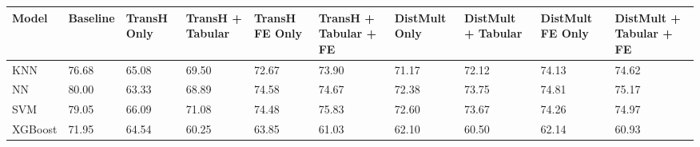\begin{tabular}{llllllllll}
\toprule
Model & Baseline & TransH Only & TransH + Tabular & TransH FE Only & TransH + Tabular + FE & DistMult Only & DistMult + Tabular & DistMult FE Only & DistMult + Tabular + FE \\
\midrule
KNN & 76.68 & 65.08 & 69.50 & 72.67 & 73.90 & 71.17 & 72.12 & 74.13 & 74.62 \\
NN & 80.00 & 63.33 & 68.89 & 74.58 & 74.67 & 72.38 & 73.75 & 74.81 & 75.17 \\
SVM & 79.05 & 66.09 & 71.08 & 74.48 & 75.83 & 72.60 & 73.67 & 74.26 & 74.97 \\
XGBoost & 71.95 & 64.54 & 60.25 & 63.85 & 61.03 & 62.10 & 60.50 & 62.14 & 60.93 \\
\bottomrule
\end{tabular}
